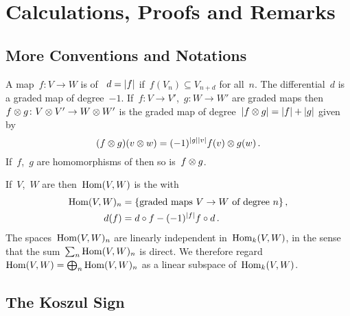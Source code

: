 \section{Calculations, Proofs and Remarks}



\subsection{More Conventions and Notations}

A map~$f \colon V \to W$ is  of ~$d = \lvert f\rvert$ if~$f(V_n) \subseteq V_{n+d}$ for all~$n$.
The differential~$d$ is a graded map of degree~$-1$.
If~$f \colon V \to V'$,~$g \colon W \to W'$ are graded maps then~$f \otimes g \colon V \otimes V' \to W \otimes W'$ is the graded map of degree~$\lvert f \otimes g\rvert = \lvert f\rvert + \lvert g\rvert$ given by
\[
  (f \otimes g)(v \otimes w)
  =
  (-1)^{\lvert g\rvert \lvert v\rvert}
  f(v) \otimes g(w) \,.
\]
If~$f$,~$g$ are homomorphisms of {\dgvs} then so is~$f \otimes g$.

If~$V$,~$W$ are {\dgvs} then~$\operatorname{Hom}(V,W)$ is the {\dgv} with
\begin{align*}
  \operatorname{Hom}(V,W)_n
  &=
  \{
    \text{graded maps~$V \to W$ of degree~$n$}
  \} \,,
  \\
  d(f)
  &=
  d \circ f - (-1)^{\lvert f\rvert} f \circ d \,.
\end{align*}
The spaces~$\operatorname{Hom}(V,W)_n$ are linearly independent in~$\operatorname{Hom}_k(V,W)$, in the sense that the sum~$\sum_n \operatorname{Hom}(V,W)_n$ is direct.
We therefore regard~$\operatorname{Hom}(V,W) = \bigoplus_n \operatorname{Hom}(V,W)_n$ as a linear subspace of~$\operatorname{Hom}_k(V,W)$.






\subsection{The Koszul Sign}
\label{koszul sign proof}

